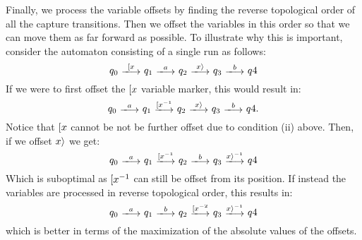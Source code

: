 Finally, we process the variable offsets by finding the reverse topological
order of all the capture transitions. Then we offset the variables in this order
so that we can move them as far forward as possible. To illustrate why this is
important, consider the automaton consisting of a single run as follows:
$$q_0\ \longtrans{\Open{x}}\ q_1\ \longtrans{a}\ q_2\ \longtrans{\Close{x}}\
q_3\ \longtrans{b}\ q4$$ If we were to first offset the $[ x$ variable
marker, this would result in:
$$q_0\ \longtrans{a}\ q_1\ \longtrans{\Open{x}^{-1}}\ q_2\
\longtrans{\Close{x}}\ q_3\ \longtrans{b}\ q4.$$ Notice that $[ x$ cannot
be not be further offset due to condition (ii) above. Then, if we offset
$x \rangle$ we get: $$q_0\ \longtrans{a}\ q_1\ \longtrans{\Open{x}^{-1}}\ q_2\
\longtrans{b}\ q_3\ \longtrans{\Close{x}^{-1}}\ q4$$ Which is suboptimal as
$[ x^{-1}$ can still be offset from its position. If instead the variables
are processed in reverse topological order, this results in:
$$q_0\ \longtrans{a}\ q_1\ \longtrans{b}\ q_2\ \longtrans{\Open{x}^{-2}}\ q_3\
\longtrans{\Close{x}^{-1}}\ q4$$ which is better in terms of the maximization of
the absolute values of the offsets.